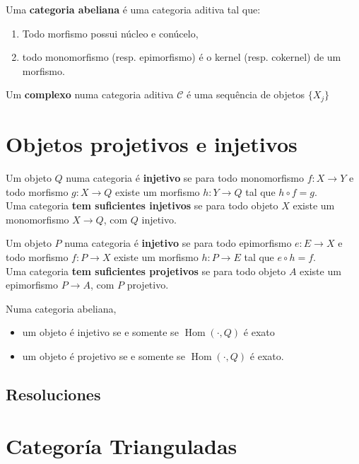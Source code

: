 Uma \textbf{categoria abeliana} é uma categoria aditiva tal que:
\begin{enumerate}
	\item Todo morfismo possui núcleo e conúcelo,
	\item todo monomorfismo (resp. epimorfismo) é o kernel (resp. cokernel) de um morfismo.
\end{enumerate}


Um \textbf{complexo} numa categoria aditiva $\mathcal{C}$ é uma sequência de objetos $\{X_j\}$

\section{Objetos projetivos e injetivos}

Um objeto $Q$ numa categoria é \textbf{injetivo} se para todo monomorfismo $f:X\rightarrow Y$ e todo morfismo $g:X \rightarrow Q$ existe um morfismo $h: Y\rightarrow Q$ tal que $h\circ f =g$.\\
Uma categoria \textbf{tem suficientes injetivos} se para todo objeto $X$ existe um monomorfismo $X\rightarrow Q$, com $Q$ injetivo.


Um objeto $P$ numa categoria é \textbf{injetivo} se para todo epimorfismo $e:E\rightarrow X$ e todo morfismo $f:P \rightarrow X$ existe um morfismo $h: P\rightarrow E$ tal que $e\circ h =f$.\\
Uma categoria \textbf{tem suficientes projetivos} se para todo objeto $A$ existe um epimorfismo $P\rightarrow A$, com $P$ projetivo.

\begin{prop}
	Numa categoria abeliana, 
	\begin{itemize}
		\item um objeto é injetivo se e somente se $\operatorname{Hom}(\cdot , Q)$ é exato
		\item um objeto é projetivo se e somente se $\operatorname{Hom}(\cdot , Q)$ é exato.
	\end{itemize}
\end{prop}



\subsection{Resoluciones}


\section{Categoría Trianguladas}



